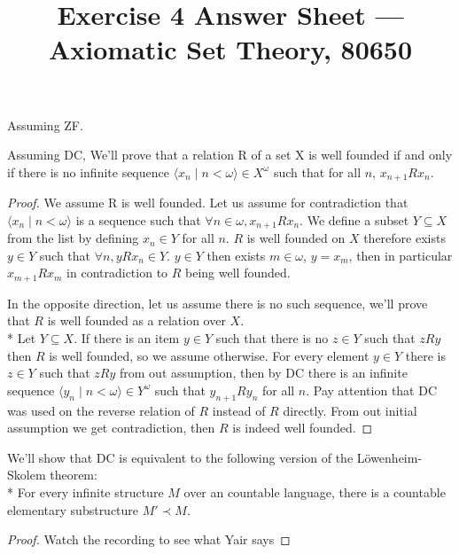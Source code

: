 
\title{Exercise 4 Answer Sheet --- Axiomatic Set Theory, 80650}


\maketitle
\maketitleprint{}

\question{}
Assuming ZF.\@

\subquestion{}
Assuming DC, We'll prove that a relation R of a set X is well founded if and only if there is no infinite sequence $\langle x_n \mid n < \omega \rangle \in X^\omega$ such that for all $n$, $x_{n + 1} R x_n$.
\begin{proof}
	We assume R is well founded.
	Let us assume for contradiction that $\langle x_n \mid n < \omega \rangle$ is a sequence such that $\forall n \in \omega, x_{n + 1} R x_n$.
	We define a subset $Y \subseteq X$ from the list by defining $x_n \in Y$ for all $n$. $R$ is well founded on $X$ therefore exists $y \in Y$ such that $\forall n, y R x_n \in Y$.
	$y \in Y$ then exists $m \in \omega$, $y = x_m$, then in particular $x_{m + 1} R x_m$ in contradiction to $R$ being well founded.

	In the opposite direction, let us assume there is no such sequence, we'll prove that $R$ is well founded as a relation over $X$. \\*
	Let $Y \subseteq X$. If there is an item $y \in Y$ such that there is no $z \in Y$ such that $z R y$ then $R$ is well founded, so we assume otherwise.
	For every element $y \in Y$ there is $z \in Y$ such that $z R y$ from out assumption, then by DC there is an infinite sequence $\langle y_n \mid n < \omega \rangle \in Y^\omega$ such that $y_{n + 1} R y_n$ for all $n$.
	Pay attention that DC was used on the reverse relation of $R$ instead of $R$ directly.
	From out initial assumption we get contradiction, then $R$ is indeed well founded.
\end{proof}

\subquestion{}
We'll show that DC is equivalent to the following version of the L\"owenheim-Skolem theorem: \\*
For every infinite structure $M$ over an countable language, there is a countable elementary substructure $M' \prec M$.
\begin{proof}
	Watch the recording to see what Yair says
\end{proof}

